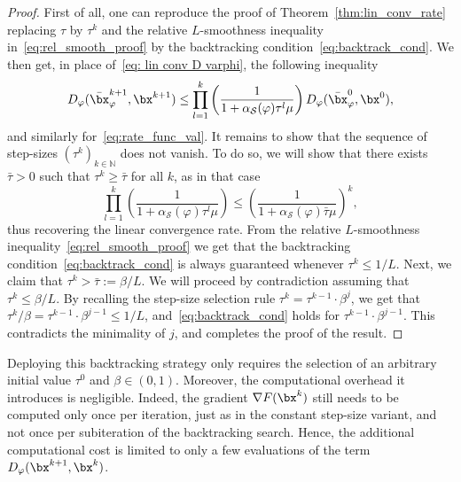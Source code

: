\documentclass[11pt]{amsart}
\newcommand{\jc}[1]{{\color{red}#1}}
\begin{document}
\begin{proof}
First of all, one can reproduce the proof of Theorem~\ref{thm:lin_conv_rate} replacing $\tau$ by $\tau^k$ and the relative $L$-smoothness inequality in~\eqref{eq:rel_smooth_proof} by the backtracking condition~\eqref{eq:backtrack_cond}. We then get, in place of~\eqref{eq: lin conv D varphi}, the following inequality
\begin{equation}
    D_{\varphi}(\bar\bx^{k+1}_{\varphi},\bx^{k+1})\leq \prod_{l=1}^k \left(\frac{1}{1+\alpha_\mathcal{S}(\varphi)\tau^l\mu}\right) D_{\varphi}(\bar\bx^{0}_{\varphi},\bx^{0}),
\end{equation}
and similarly for~\eqref{eq:rate_func_val}. It remains to show that the sequence of step-sizes $(\tau^k)_{k \in \mathbb{N}}$ does not vanish. To do so, we will show that there  exists $\bar \tau >0$ such that  $ \tau^k \geq \bar \tau$ for all $k$, as in that case
$$
\prod_{l=1}^k \left(\frac{1}{1+\alpha_\mathcal{S}(\varphi)\tau^l\mu}\right) \leq \left(\frac{1}{1+\alpha_\mathcal{S}(\varphi)\bar \tau\mu}\right)^k,
$$
thus recovering the linear convergence rate. From the relative $L$-smoothness inequality~\eqref{eq:rel_smooth_proof} we get that the backtracking condition~\eqref{eq:backtrack_cond}
is always guaranteed whenever $\tau^k \leq 1/L$. Next, we claim that $\tau^k>\bar\tau:=\beta/L$. We will proceed by contradiction assuming that $\tau^k \leq  {\beta}/{L}$. By recalling the step-size selection rule $\tau^k = \tau^{k-1} \cdot \beta^j$, we get that $\tau^k / \beta = \tau^{k-1} \cdot \beta^{j-1} \leq {1}/{L}$, and~\eqref{eq:backtrack_cond} holds for $\tau^{k-1} \cdot \beta^{j-1}$. This contradicts the minimality of $j$, and completes the proof of the result.
\end{proof}

Deploying this backtracking strategy only requires the selection of an arbitrary initial value $\tau^0$ and $\beta \in(0,1)$. Moreover, the computational overhead it introduces is negligible. Indeed, the gradient $\nabla F(\bx^k)$ still needs to be computed only once per iteration, just as in the constant step-size variant, and not once per subiteration of the backtracking search. Hence, the additional computational cost is limited to only a few evaluations of the term $D_\varphi(\bx^{k+1}, \bx^k)$.\\

\end{document}

